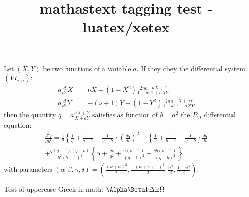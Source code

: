 \documentclass{article}
\title{mathastext tagging test - luatex/xetex}
\begin{document}
Let $(X,Y)$ be two functions of a variable $a$. If they obey  the differential
system  $(VI_{\nu,n})$:
\begin{align*}
a\frac{d}{da} X &= \nu
X - (1 - X^2)\frac{2n a}{1 - a^2}\frac{aX+Y}{1+a XY} \\
a\frac{d}{da} Y &= -(\nu+1) Y
+ (1 - Y^2)\frac{2n a}{1 - a^2}\frac{X+aY}{1+a XY}
\end{align*}
then the quantity $q = a \frac{aX+Y}{X+aY}$
satisfies as function of $b= a^2$  the $P_{VI}$ differential equation:
\begin{equation*}
\begin{split}
\frac{d^2 q}{db^2} = \frac12\left\{\frac1q+\frac1{q-1}
+\frac1{q-b}\right\}\left(\frac{dq}{db}\right)^2 - \left\{\frac1b+\frac1{b-1}
+\frac1{q-b}\right\}\frac{dq}{db}\\+\frac{q(q-1)(q-b)}{b^2(b-1)^2}\left\{\alpha+\frac{\beta
b}{q^2} + \frac{\gamma (b-1)}{(q-1)^2}+\frac{\delta
b(b-1)}{(q-b)^2}\right\}
\end{split}
\end{equation*}
with
parameters
$(\alpha,\beta,\gamma,\delta) = (\frac{(\nu+n)^2}2,
\frac{-(\nu+n+1)^2}2, \frac{n^2}2, \frac{1 - n^2}2)$.

Test of uppercase Greek in math: $\Alpha\Beta\Gamma\Delta\Xi\Omega$.
\end{document}
